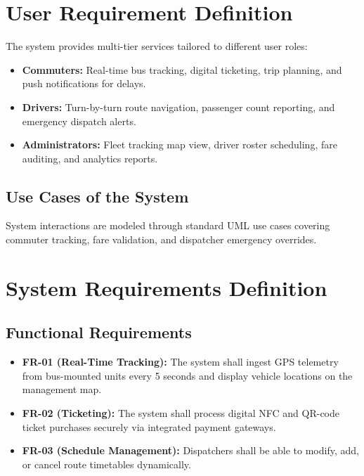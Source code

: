 \documentclass[11pt, a4paper]{article}
\begin{document}
\section{User Requirement Definition}
The system provides multi-tier services tailored to different user roles:
\begin{itemize}[leftmargin=*]
    \item \textbf{Commuters:} Real-time bus tracking, digital ticketing, trip planning, and push notifications for delays.
    \item \textbf{Drivers:} Turn-by-turn route navigation, passenger count reporting, and emergency dispatch alerts.
    \item \textbf{Administrators:} Fleet tracking map view, driver roster scheduling, fare auditing, and analytics reports.
\end{itemize}

\subsection{Use Cases of the System}
System interactions are modeled through standard UML use cases covering commuter tracking, fare validation, and dispatcher emergency overrides.

\section{System Requirements Definition}
\subsection{Functional Requirements}
\begin{itemize}[leftmargin=*]
    \item \textbf{FR-01 (Real-Time Tracking):} The system shall ingest GPS telemetry from bus-mounted units every 5 seconds and display vehicle locations on the management map.
    \item \textbf{FR-02 (Ticketing):} The system shall process digital NFC and QR-code ticket purchases securely via integrated payment gateways.
    \item \textbf{FR-03 (Schedule Management):} Dispatchers shall be able to modify, add, or cancel route timetables dynamically.
\end{itemize}
\end{document}
